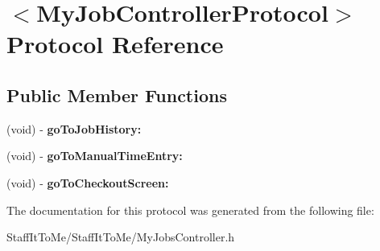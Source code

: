\hypertarget{protocol_my_job_controller_protocol-p}{
\section{$<$\-My\-Job\-Controller\-Protocol$>$ \-Protocol \-Reference}
\label{protocol_my_job_controller_protocol-p}
}
\subsection*{\-Public \-Member \-Functions}
\begin{DoxyCompactItemize}
\item 
\hypertarget{protocol_my_job_controller_protocol-p_a5e5039ce830d6934ff03f2a837db8c01}{
(void) -\/ {\bfseries go\-To\-Job\-History\-:}}
\label{protocol_my_job_controller_protocol-p_a5e5039ce830d6934ff03f2a837db8c01}

\item 
\hypertarget{protocol_my_job_controller_protocol-p_a1537667e3923c023cbd233e8f4e74fd4}{
(void) -\/ {\bfseries go\-To\-Manual\-Time\-Entry\-:}}
\label{protocol_my_job_controller_protocol-p_a1537667e3923c023cbd233e8f4e74fd4}

\item 
\hypertarget{protocol_my_job_controller_protocol-p_a732ea16ca1b31c39cfccb9322239fc44}{
(void) -\/ {\bfseries go\-To\-Checkout\-Screen\-:}}
\label{protocol_my_job_controller_protocol-p_a732ea16ca1b31c39cfccb9322239fc44}

\end{DoxyCompactItemize}


\-The documentation for this protocol was generated from the following file\-:\begin{DoxyCompactItemize}
\item 
\-Staff\-It\-To\-Me/\-Staff\-It\-To\-Me/\-My\-Jobs\-Controller.\-h\end{DoxyCompactItemize}
